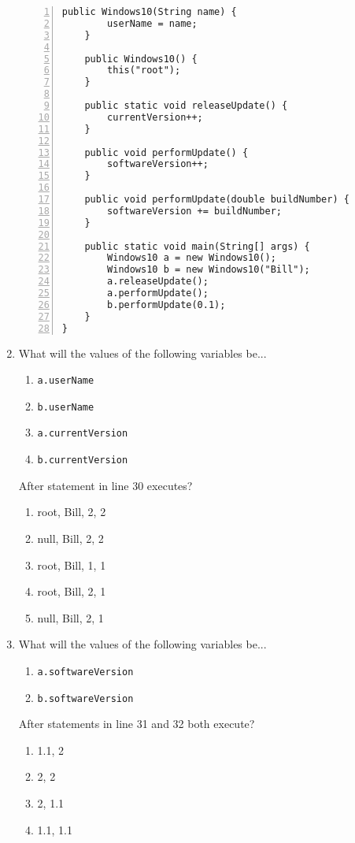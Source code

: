\documentclass[CS180-S16-FinalExam.tex]{subfiles}
\begin{document}
\begin{enumerate}
\begin{lstlisting}[numbers=left]
    public Windows10(String name) {
    	userName = name;
    }
    
    public Windows10() {
    	this("root");
    }
    
    public static void releaseUpdate() {
    	currentVersion++;
    }
    
    public void performUpdate() {
    	softwareVersion++;
    }
    
    public void performUpdate(double buildNumber) {
        softwareVersion += buildNumber;
    }
    
    public static void main(String[] args) {
		Windows10 a = new Windows10();
		Windows10 b = new Windows10("Bill");
		a.releaseUpdate();       
		a.performUpdate();      
		b.performUpdate(0.1);   
    }
}
\end{lstlisting}

\item What will the values of the following variables be...
\begin{enumerate}[i]
\item \texttt{a.userName}
\item \texttt{b.userName}
\item \texttt{a.currentVersion}
\item \texttt{b.currentVersion}
\end{enumerate}

\clearpage
After statement in line 30 executes?
\begin{enumerate}
\item root, Bill, 2, 2 \ifdraft \Ans \fi
\item null, Bill, 2, 2
\item root, Bill, 1, 1
\item root, Bill, 2, 1
\item null, Bill, 2, 1
\end{enumerate}

\item What will the values of the following variables be...
\begin{enumerate}[i]
\item \texttt{a.softwareVersion}
\item \texttt{b.softwareVersion}
\end{enumerate}

After statements in line 31 and 32 both execute?
\begin{enumerate}
\item 1.1, 2
\item 2, 2
\item 2, 1.1 \ifdraft \Ans \fi
\item 1.1, 1.1
\end{enumerate}


\end{enumerate}
\end{document}
